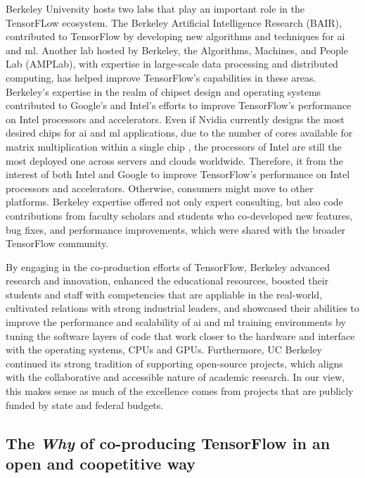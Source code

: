 \documentclass[CHICAGO,Times1COL]{WileyNJDv5} %
\begin{document}
Berkeley University hosts two labs that play an important role in the TensorFLow ecosystem. The Berkeley Artificial Intelligence Research (BAIR),  contributed to TensorFlow by developing new algorithms and techniques for \ac{ai} and \ac{ml}. Another lab hosted by Berkeley, the Algorithms, Machines, and People Lab (AMPLab), with expertise in large-scale data processing and distributed computing, has helped improve TensorFlow's capabilities in these areas. Berkeley's expertise in the realm of chipset design and operating systems contributed to Google's and Intel's efforts to improve TensorFlow's performance on Intel processors and accelerators. Even if Nvidia currently designs the most desired chips for \ac{ai} and \ac{ml} applications, due to the number of cores available for matrix multiplication within a single chip \citep[see][]{Reuther_et_al2019}, the processors of Intel are still the most deployed one across servers and clouds worldwide. Therefore, it from the interest of both Intel and Google to improve TensorFlow's performance on Intel processors and accelerators. Otherwise, consumers might move to other platforms.  Berkeley expertise offered not only expert consulting, but also code contributions from faculty scholars and students who co-developed new features, bug fixes, and performance improvements, which were shared with the broader TensorFlow community.


By engaging in the co-production efforts of TensorFlow, Berkeley advanced research and innovation, enhanced the educational resources, boosted their students and staff with competencies that are appliable in the real-world, cultivated relations with strong industrial leaders, and showcased their abilities to improve the performance and scalability of \ac{ai} and {ml} training environments by tuning the software layers of code that work closer to the hardware and interface with the operating systems, CPUs and GPUs.   Furthermore, UC Berkeley continued its strong tradition of supporting open-source projects, which aligns with the collaborative and accessible nature of academic research.  In our view, this makes sense as much of the excellence comes from projects that are publicly funded by state and federal budgets. 



\subsection{The \textit{Why} of co-producing TensorFlow in an open and coopetitive way}
\end{document}
